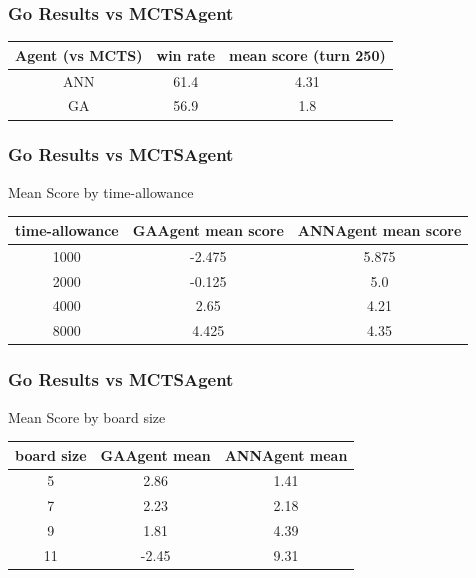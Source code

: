 \documentclass{beamer}
\begin{document}
\begin{frame}
\frametitle{Go Results vs MCTSAgent}
\begin{center}
\begin{tabular}{|c|c|c|}
\hline
Agent (vs MCTS) & win rate & mean score (turn 250) \\ \hline \hline
ANN & 61.4 & 4.31 \\ \hline
GA & 56.9 & 1.8 \\ \hline
\end{tabular}
\end{center}
\end{frame}

\begin{frame}
\frametitle{Go Results vs MCTSAgent}
\begin{center}
Mean Score by time-allowance
\begin{tabular}{|c|c|c|}
\hline
time-allowance & GAAgent mean score & ANNAgent mean score \\ \hline \hline
1000 & -2.475 & 5.875 \\ \hline
2000 & -0.125 & 5.0 \\ \hline
4000 & 2.65 & 4.21 \\ \hline
8000 & 4.425 & 4.35 \\ \hline
\end{tabular}
\end{center}
\end{frame}

\begin{frame}
\frametitle{Go Results vs MCTSAgent}
\begin{center}
Mean Score by board size
\begin{tabular}{|c|c|c|}
\hline
board size & GAAgent mean & ANNAgent mean \\ \hline \hline
5 & 2.86 & 1.41 \\ \hline
7 & 2.23 & 2.18 \\ \hline
9 & 1.81 & 4.39 \\ \hline
11 & -2.45 & 9.31 \\ \hline
\end{tabular}
\end{center}
\end{frame}
\end{document}
